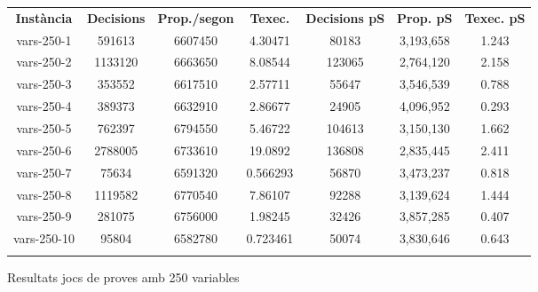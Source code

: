 \begin{figure}[H]
	\centering
	\begin{table}[H]
		\begin{tabular}{ccccccc}
			\rowcolor[HTML]{C0C0C0} 
			{\color[HTML]{000000} \textbf{Instància}} & {\color[HTML]{000000} \textbf{Decisions}} & {\color[HTML]{000000} \textbf{Prop./segon}} & {\color[HTML]{000000} \textbf{Texec.}} & {\color[HTML]{000000} \textbf{Decisions pS}}& {\color[HTML]{000000} \textbf{Prop. pS}}& {\color[HTML]{000000} \textbf{Texec. pS}} \\
			vars-250-1 & 591613 & 6607450 & 4.30471 & 80183 & 3,193,658 & 1.243\\
			vars-250-2 & 1133120 & 6663650 & 8.08544 & 123065 & 2,764,120 & 2.158\\
			vars-250-3 & 353552 & 6617510 & 2.57711 & 55647 & 3,546,539 & 0.788\\
			vars-250-4 & 389373 & 6632910 & 2.86677 & 24905 & 4,096,952 & 0.293\\
			vars-250-5 & 762397 & 6794550 & 5.46722 & 104613 & 3,150,130 & 1.662\\
			vars-250-6 & 2788005 & 6733610 & 19.0892 & 136808 & 2,835,445 & 2.411\\
			vars-250-7 & 75634 & 6591320 & 0.566293 & 56870 & 3,473,237 & 0.818\\
			vars-250-8 & 1119582 & 6770540 & 7.86107 & 92288 & 3,139,624 & 1.444\\
			vars-250-9 & 281075 & 6756000 & 1.98245 & 32426 & 3,857,285 & 0.407\\
			vars-250-10 & 95804 & 6582780 & 0.723461 & 50074 & 3,830,646 & 0.643\\
			& & & &                                                     
		\end{tabular}
	\end{table}
	\caption{Resultats jocs de proves amb 250 variables}
	\label{fig:my_label4}
\end{figure}

